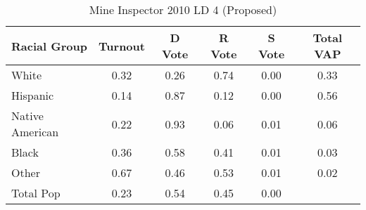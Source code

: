 \begin{table}[htb]
\begin{center}
\caption{Mine Inspector 2010 LD 4 (Proposed)}
\label{smine_vap_ld_4}
\begin{tabular}{lccccc}
  \hline
Racial Group & Turnout & D Vote & R Vote & S Vote & Total VAP \\ 
  \hline
White & 0.32 & 0.26 & 0.74 & 0.00 & 0.33 \\ 
  Hispanic & 0.14 & 0.87 & 0.12 & 0.00 & 0.56 \\ 
  Native American & 0.22 & 0.93 & 0.06 & 0.01 & 0.06 \\ 
  Black & 0.36 & 0.58 & 0.41 & 0.01 & 0.03 \\ 
  Other & 0.67 & 0.46 & 0.53 & 0.01 & 0.02 \\ 
  Total Pop & 0.23 & 0.54 & 0.45 & 0.00 &  \\ 
   \hline
\end{tabular}
\end{center}
\end{table}
